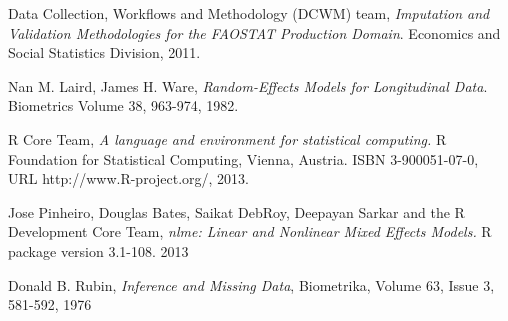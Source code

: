 \documentclass[nojss]{jss}\usepackage{graphicx, color}
\begin{document}
\begin{thebibliography}{9}
  Data Collection, Workflows and Methodology (DCWM) team,
  \emph{Imputation and Validation Methodologies for the FAOSTAT Production Domain}.
  Economics and Social Statistics Division,
  2011.
  
  Nan M. Laird, James H. Ware,
  \emph{Random-Effects Models for Longitudinal Data}.
  Biometrics Volume 38, 963-974,
  1982.
  
  R Core Team,
  \emph{A language and environment for statistical computing.}
  R Foundation for Statistical Computing, Vienna, Austria.
  ISBN 3-900051-07-0, URL http://www.R-project.org/,
  2013.
  
  Jose Pinheiro, Douglas Bates, Saikat DebRoy, Deepayan Sarkar and the
  R Development Core Team,
  \emph{nlme: Linear and Nonlinear Mixed Effects Models.} 
  R package version 3.1-108.
  2013
  
  Donald B. Rubin,
  \emph{Inference and Missing Data},
  Biometrika, Volume 63, Issue 3, 581-592,
  1976
\end{thebibliography}
  
  
\end{document}
